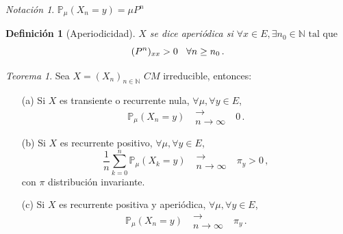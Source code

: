 \documentclass[letterpaper,11pt]{article} %
\def\espacio{\hspace{.25cm}\,}
\theoremstyle{defbreak}
\newtheorem{definition}{Definición}[subsection]
\theoremstyle{propbreak}
\theoremstyle{remark}
\newtheorem*{notation}{Notación}
\theoremstyle{break}
\newtheorem{theorem}{Teorema}[subsection]
\def\P{\mathbb{P}}
\def\N{\mathbb{N}}
\def\conv{\mbox{ }\substack{\longrightarrow \\ n\to\infty}\mbox{ }}
\def\tq{\mbox{ tal que }}
\begin{document}
\begin{notation}
$\P_\mu(X_n=y)=\mu P^n$
\end{notation}
\begin{definition}[Aperiodicidad]
$X$ se dice aperiódica si $\forall x\in E,\exists n_0\in\N\tq$
$$(P^n)_{xx}>0\espacio \forall n\geq n_0 \, .$$
\end{definition}
\begin{theorem}
Sea $X=(X_n)_{n\in \N}$ $CM$ irreducible, entonces:
\begin{itemize}
    \item[(a)] Si $X$ es transiente o recurrente nula, $\forall\mu,\forall y\in E$,     $$ \P_\mu(X_n=y)\conv 0 \, .$$
    \item[(b)] Si $X$ es recurrente positivo, $\forall\mu,\forall y\in E$,
    $$ \displaystyle\frac{1}{n}\sum^n_{k=0}\P_\mu(X_k=y)\conv \pi_y>0 \, ,$$
    con $\pi$ distribución invariante.
    \item[(c)] Si $X$ es recurrente positiva y aperiódica, $\forall\mu,\forall y\in E$,
    $$ \P_\mu(X_n=y)\conv \pi_y \, .$$
\end{itemize}
\end{theorem}

\end{document}
